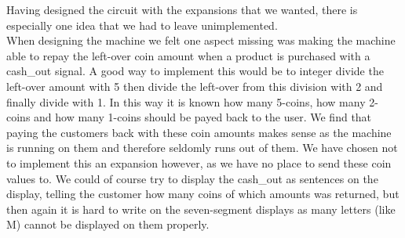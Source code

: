 Having designed the circuit with the expansions that we wanted, there is especially one idea that we had to leave unimplemented.\\

When designing the machine we felt one aspect missing was making the machine able to repay the left-over coin amount when a product is purchased with a cash\_out signal. A good way to implement this would be to integer divide the left-over amount with 5 then divide the left-over from this division with 2 and finally divide with 1. In this way it is known how many 5-coins, how many 2-coins and how many 1-coins should be payed back to the user. We find that paying the customers back with these coin amounts makes sense as the machine is running on them and therefore seldomly runs out of them. We have chosen not to implement this an expansion however, as we have no place to send these coin values to. We could of course try to display the cash\_out as sentences on the display, telling the customer how many coins of which amounts was returned, but then again it is hard to write on the seven-segment displays as many letters (like M) cannot be displayed on them properly.

